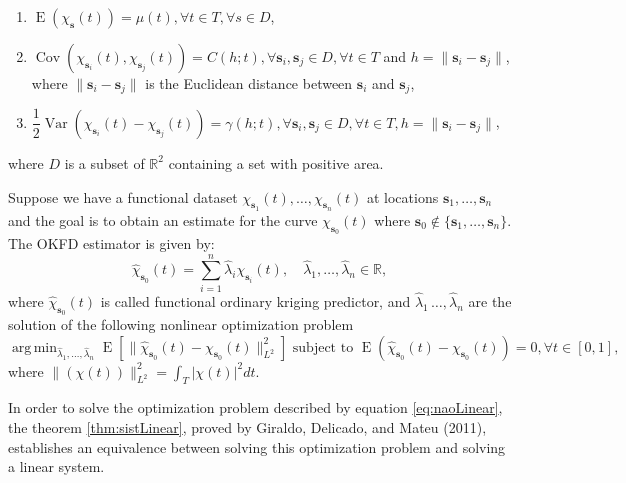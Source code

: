 \documentclass[
  12pt,
]{article}
\theoremstyle{definition}
\theoremstyle{definition}
\theoremstyle{definition}
\theoremstyle{remark}
\begin{document}
\begin{enumerate}
    \item $\mathop{\mathrm{E}}(\chi_{\bm{s}}(t)) = \mu(t), \forall t \in T, \forall s \in D$,
    \item $\mathop{\mathrm{Cov}}(\chi_{\bm{s}_i}(t), \chi_{\bm{s}_j}(t)) = C(h;t), \forall \bm{s}_i, \bm{s}_j \in D, \forall t \in T$ and
    $h = \lVert\bm{s}_i -\bm{s}_j\rVert$, where $\lVert\bm{s}_i -\bm{s}_j\rVert$ is the Euclidean distance between $\bm{s}_i$ and $\bm{s}_j$,
    \item $\dfrac{1}{2}\mathop{\mathrm{Var}}(\chi_{\bm{s}_i}(t)-\chi_{\bm{s}_j}(t))= \gamma(h;t), \forall \bm{s}_i, \bm{s}_j \in D, \forall t \in T, h = \lVert\bm{s}_i-\bm{s}_j\rVert$,
\end{enumerate}

where \(D\) is a subset of \(\mathbb{R}^2\) containing a set with positive area.

Suppose we have a functional dataset \(\chi_{\bm{s}_1}(t), \dots, \chi_{\bm{s}_n}(t)\) at locations \(\bm{s}_1, \dots, \bm{s}_n\) and the goal is to obtain an estimate for the curve \(\chi_{\bm{s}_0}(t)\) where \(\bm{s}_0 \not\in \{\bm{s}_1, \dots, \bm{s}_n\}\). The OKFD estimator is given by:
\begin{equation}
\hat\chi_{\bm{s}_0} (t) = \sum_{i=1}^{n} \hat\lambda_i \chi_{\bm{s}_i}(t),\quad \hat\lambda_1, \dots, \hat\lambda_{n} \in \mathbb{R},
\label{eq:ModelOrdinary}
\end{equation}
where \(\hat\chi_{\bm{s}_0}(t)\) is called functional ordinary kriging predictor, and \(\hat\lambda_1\, \dots, \hat\lambda_{n}\) are the solution of the following nonlinear optimization problem
\begin{equation}
\mathop{\mathrm{arg\,min}}_{\hat{\lambda}_1, \dots, \hat{\lambda}_{n}} \mathop{\mathrm{E}}\left[ \lVert\hat{\chi}_{\bm{s}_0}(t) - \chi_{\bm{s}_0}(t) \rVert^2_{L^2}\right] \mbox{ subject to }\mathop{\mathrm{E}}(\hat{\chi}_{\bm{s}_0}(t) - \chi_{\bm{s}_0}(t)) =0, \forall t \in [0,1],
\label{eq:naoLinear}
\end{equation}
where \(\lVert(\chi(t))\rVert^2_{L^2}= \int_{T} \lvert \chi(t)\rvert^2 dt.\)

In order to solve the optimization problem described by equation \eqref{eq:naoLinear}, the theorem \ref{thm:sistLinear}, proved by Giraldo, Delicado, and Mateu (2011), establishes an equivalence between solving this optimization problem and solving a linear system.
\end{document}

